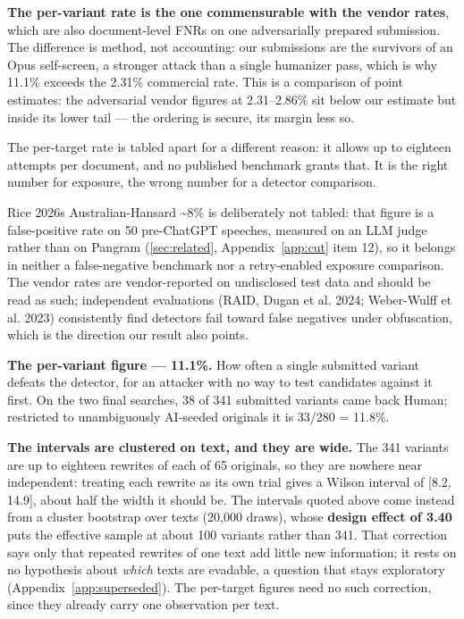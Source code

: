 \textbf{The per-variant rate is the one commensurable with the vendor rates}, which are also document-level FNRs on one adversarially prepared submission. The difference is method, not accounting: our submissions are the survivors of an Opus self-screen, a stronger attack than a single humanizer pass, which is why 11.1\% exceeds the 2.31\% commercial rate. This is a comparison of point estimates: the adversarial vendor figures at 2.31--2.86\% sit below our estimate but inside its lower tail --- the ordering is secure, its margin less so.

The per-target rate is tabled apart for a different reason: it allows up to eighteen attempts per document, and no published benchmark grants that. It is the right number for exposure, the wrong number for a detector comparison.

Rice 2026\textquotesingle s Australian-Hansard \textasciitilde8\% is deliberately not tabled: that figure is a false-positive rate on 50 pre-ChatGPT speeches, measured on an LLM judge rather than on Pangram (\cref{sec:related}, Appendix~\ref{app:cut} item 12), so it belongs in neither a false-negative benchmark nor a retry-enabled exposure comparison. The vendor rates are vendor-reported on undisclosed test data and should be read as such; independent evaluations (RAID, Dugan et al. 2024; Weber-Wulff et al. 2023) consistently find detectors fail toward false negatives under obfuscation, which is the direction our result also points.

\textbf{The per-variant figure --- 11.1\%.} How often a single submitted variant
defeats the detector, for an attacker with no way to test candidates against
it first. On the two final searches, 38 of 341 submitted variants came back
Human; restricted to unambiguously AI-seeded originals it is 33/280 = 11.8\%.

\textbf{The intervals are clustered on text, and they are wide.} The 341 variants
are up to eighteen rewrites of each of 65 originals, so they are nowhere near
independent: treating each rewrite as its own trial gives a Wilson interval of
{[}8.2, 14.9{]}, about half the width it should be. The intervals quoted above
come instead from a cluster bootstrap over texts (20,000 draws), whose
\textbf{design effect of 3.40} puts the effective sample at about 100 variants
rather than 341. That correction says only that repeated rewrites of one text
add little new information; it rests on no hypothesis about \emph{which} texts are
evadable, a question that stays exploratory (Appendix~\ref{app:superseded}). The per-target
figures need no such correction, since they already carry one observation per
text.

